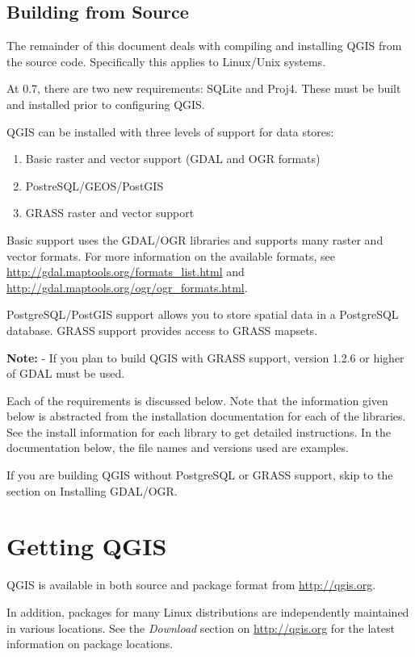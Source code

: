 \subsection{Building from Source}
The remainder of this document deals with compiling and installing QGIS from the
source code. Specifically this applies to Linux/Unix systems.

At 0.7, there are two new requirements: SQLite and Proj4. These must be built and installed prior to configuring QGIS.

QGIS can be installed with three levels of support for data stores:
\begin{enumerate}
\item Basic raster and vector support (GDAL and OGR formats)
\item PostreSQL/GEOS/PostGIS 
\item GRASS raster and vector support
\end{enumerate} 

Basic support uses the GDAL/OGR libraries and supports many raster and
vector formats. For more information on the available formats, see
\url{http://gdal.maptools.org/formats_list.html} and
\url{http://gdal.maptools.org/ogr/ogr_formats.html}.

PostgreSQL/PostGIS support allows you to store spatial data in a PostgreSQL database. GRASS support provides access to GRASS mapsets. 

\textbf{Note:} - If you plan to build QGIS with GRASS support, version 1.2.6 or higher of GDAL must be used. 
  
Each of the requirements is discussed below. Note that the information given below is abstracted from the installation documentation for each of the libraries. See the install information for each library to get detailed instructions. In the documentation below, the file names and versions used are examples.


If you are building QGIS without PostgreSQL or GRASS support, skip to the section on Installing GDAL/OGR. 
\section{Getting QGIS}
QGIS is available in both source and package format from \url{http://qgis.org}. 

In addition, packages for many Linux distributions are independently maintained in various locations. See 
the \textit{Download} section on \url{http://qgis.org} for the latest information on package locations.

